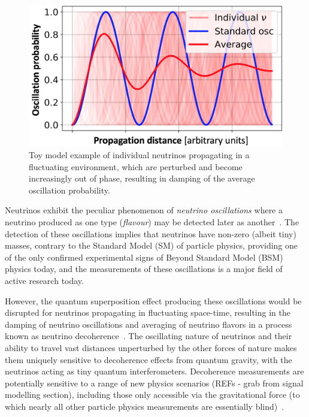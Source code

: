 \documentclass[a4paper,11pt]{article}
\begin{document}
\begin{figure} %
    \centering
		\vspace{-7pt}
		\includegraphics[width=1.\linewidth]{images/decoherence.png}
		\caption{Toy model example of individual neutrinos propagating in a fluctuating environment, which are perturbed and become increasingly out of phase, resulting in damping of the average oscillation probability.}
		\vspace{-5pt}
		\label{fig:decoherence}
\end{figure}

Neutrinos exhibit the peculiar phenomenon of \textit{neutrino oscillations} where a neutrino produced as one type (\textit{flavour}) may be detected later as another~\cite{Fukuda:1998mi, Ahmad:2001an,Ahmad:2002jz}. The detection of these oscillations implies that neutrinos have non-zero (albeit tiny) masses, contrary to the Standard Model (SM) of particle physics, providing one of the only confirmed experimental signs of Beyond Standard Model (BSM) physics today, and the measurements of these oscillations is a major field of active research today.

However, the quantum superposition effect producing these oscillations would be disrupted for neutrinos propagating in fluctuating space-time, resulting in the damping of neutrino oscillations and averaging of neutrino flavors in a process known as neutrino decoherence~\cite{Benatti_2000, PhysRevLett.85.1166}. The oscillating nature of neutrinos and their ability to travel vast distances unperturbed by the other forces of nature makes them uniquely sensitive to decoherence effects from quantum gravity, with the neutrinos acting as tiny quantum interferometers. Decoherence measurements are potentially sensitive to a range of new physics scenarios (REFs - grab from signal modelling section), including those only accessible via the gravitational force (to which nearly all other particle physics measurements are essentially blind)~\cite{Hellmann:2021jyz}.
\end{document}
